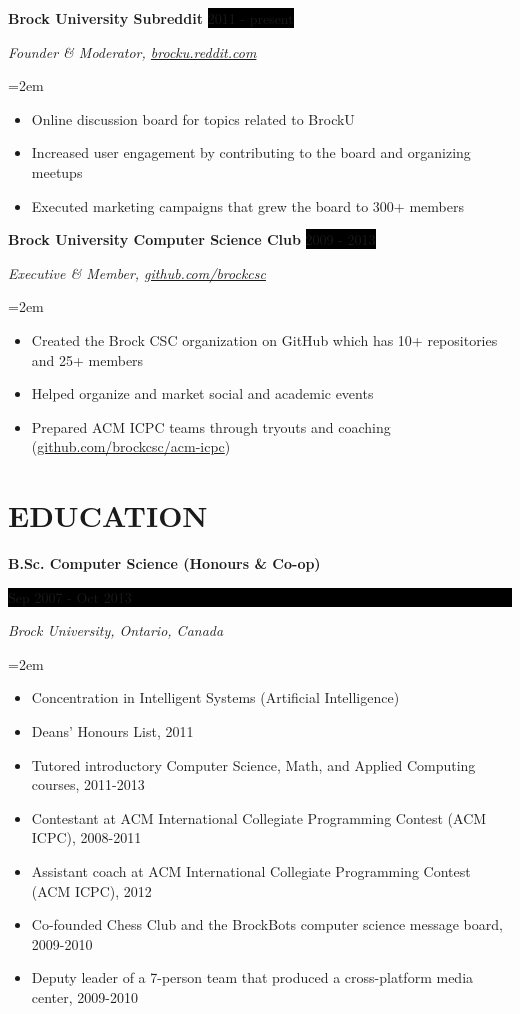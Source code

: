 \documentclass[paper=a4,fontsize=11pt]{scrartcl} %
\newcommand{\sepspace}{\vspace*{1em}}     %
\newcommand{\NewPart}[1]{\section*{\uppercase{#1}}}
\newcommand{\EducationEntry}[4]{
    \noindent \textbf{#1} \hfill        %
    \colorbox{Black}{
      \parbox{8.5em}{
      \hfill\color{White}#2}} \par      %
    \noindent \textit{#3} \par          %
    \noindent\hangindent=2em\hangafter=0 \small #4 %
    \normalsize \par}
\newcommand{\OrganizationEntry}[4]{         %
    \noindent \textbf{#1} \hfill            %
    \colorbox{Black}{\color{White}#2} \par  %
    \noindent \textit{#3} \par              %
    \noindent\hangindent=2em\hangafter=0 \small #4 %
    \normalsize \par}
\begin{document}
\OrganizationEntry{Brock University Subreddit}{2011 - present}
{Founder \& Moderator, \href{https://brocku.reddit.com/}{brocku.reddit.com}}
{
 \begin{itemize} \itemsep -1pt
   \item Online discussion board for topics related to BrockU
   \item Increased user engagement by contributing to the board and organizing meetups
   \item Executed marketing campaigns that grew the board to 300+ members
 \end{itemize}
}
\sepspace

\OrganizationEntry{Brock University Computer Science Club}{2009 - 2013}
{Executive \& Member, \href{https://github.com/brockcsc}{github.com/brockcsc}}
{
 \begin{itemize} \itemsep -1pt
   \item Created the Brock CSC organization on GitHub which has 10+ repositories and 25+ members
   \item Helped organize and market social and academic events
   \item Prepared ACM ICPC teams through tryouts and coaching (\url{github.com/brockcsc/acm-icpc})
 \end{itemize}
}

\NewPart{Education}{}

\EducationEntry{B.Sc. Computer Science (Honours \& Co-op)}
{Sep 2007 - Oct 2013}
{Brock University, Ontario, Canada}
{
\begin{itemize}  \itemsep -1pt
  \item Concentration in Intelligent Systems (Artificial Intelligence)
  \item Deans' Honours List, 2011
  \item Tutored introductory Computer Science, Math, and Applied Computing courses, 2011-2013
  \item Contestant at ACM International Collegiate Programming Contest (ACM ICPC), 2008-2011
  \item Assistant coach at ACM International Collegiate Programming Contest (ACM ICPC), 2012
  \item Co-founded Chess Club and the BrockBots computer science
  message board, 2009-2010
  \item Deputy leader of a 7-person team that produced a cross-platform media center, 2009-2010
\end{itemize}
}
\end{document}
